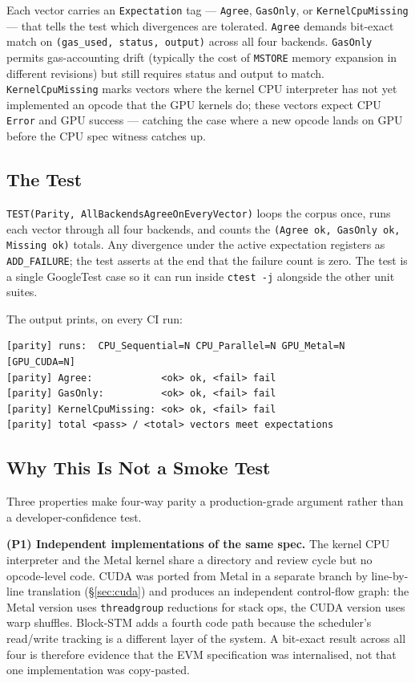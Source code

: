 Each vector carries an \texttt{Expectation} tag --- \texttt{Agree},
\texttt{GasOnly}, or \texttt{KernelCpuMissing} --- that tells the test
which divergences are tolerated. \texttt{Agree} demands bit-exact match on
\texttt{(gas\_used, status, output)} across all four backends.
\texttt{GasOnly} permits gas-accounting drift (typically the cost of
\texttt{MSTORE} memory expansion in different revisions) but still requires
status and output to match. \texttt{KernelCpuMissing} marks vectors where
the kernel CPU interpreter has not yet implemented an opcode that the GPU
kernels do; these vectors expect CPU \texttt{Error} and GPU success ---
catching the case where a new opcode lands on GPU before the CPU spec
witness catches up.

\subsection{The Test}

\texttt{TEST(Parity, AllBackendsAgreeOnEveryVector)} loops the corpus
once, runs each vector through all four backends, and counts the
\texttt{(Agree~ok, GasOnly~ok, Missing~ok)} totals. Any divergence under
the active expectation registers as \texttt{ADD\_FAILURE}; the test
asserts at the end that the failure count is zero. The test is a single
GoogleTest case so it can run inside \texttt{ctest -j} alongside the other
unit suites.

The output prints, on every CI run:

\begin{verbatim}
[parity] runs:  CPU_Sequential=N CPU_Parallel=N GPU_Metal=N [GPU_CUDA=N]
[parity] Agree:            <ok> ok, <fail> fail
[parity] GasOnly:          <ok> ok, <fail> fail
[parity] KernelCpuMissing: <ok> ok, <fail> fail
[parity] total <pass> / <total> vectors meet expectations
\end{verbatim}

\subsection{Why This Is Not a Smoke Test}

Three properties make four-way parity a production-grade argument rather
than a developer-confidence test.

\textbf{(P1) Independent implementations of the same spec.} The kernel
CPU interpreter and the Metal kernel share a directory and review cycle
but no opcode-level code. CUDA was ported from Metal in a separate
branch by line-by-line translation (\S\ref{sec:cuda}) and produces an
independent control-flow graph: the Metal version uses
\texttt{threadgroup} reductions for stack ops, the CUDA version uses
warp shuffles. Block-STM adds a fourth code path because the scheduler's
read/write tracking is a different layer of the system. A bit-exact
result across all four is therefore evidence that the EVM specification
was internalised, not that one implementation was copy-pasted.

